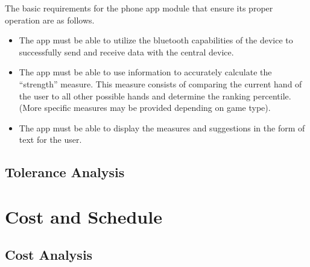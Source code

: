 \documentclass[12pt]{article}
\begin{document}
The basic requirements for the phone app module that ensure its proper operation are as follows.

\begin{itemize}
\item The app must be able to utilize the bluetooth capabilities of the device to successfully send and receive data with the central device.
\item The app must be able to use information to accurately calculate the ``strength'' measure. This measure consists of comparing the current hand of the user to all other possible hands and determine the ranking percentile. (More specific measures may be provided depending on game type).
\item The app must be able to display the measures and suggestions in the form of text for the user.
\end{itemize}

\subsection{Tolerance Analysis}

\section{Cost and Schedule}

\subsection{Cost Analysis}
\end{document}
